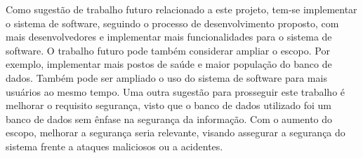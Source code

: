 Como sugestão de trabalho futuro relacionado a este projeto, tem-se  implementar o sistema de software, seguindo o processo de desenvolvimento proposto, com mais desenvolvedores e implementar mais funcionalidades para o sistema de software. O trabalho futuro pode também considerar ampliar o escopo. Por exemplo, implementar mais postos de saúde e maior população do banco de dados. Também pode ser ampliado o uso do sistema de software para mais usuários ao mesmo tempo. Uma outra sugestão para prosseguir este trabalho é melhorar o requisito segurança, visto que o banco de dados utilizado foi um banco de dados sem ênfase na segurança da informação. Com o aumento do escopo, melhorar a segurança seria relevante, visando assegurar a segurança do sistema frente a ataques maliciosos ou a acidentes. 


